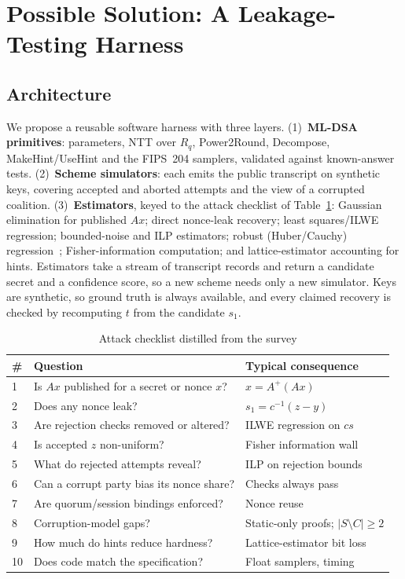 \documentclass[10pt,conference,a4paper]{IEEEtran}
\begin{document}
\section{Possible Solution: A Leakage-Testing Harness}

\subsection{Architecture}
We propose a reusable software harness with three layers.
(1)~\textbf{ML-DSA primitives}: parameters, NTT over $R_q$, Power2Round, Decompose, MakeHint/UseHint and the FIPS~204
samplers, validated against known-answer tests.
(2)~\textbf{Scheme simulators}: each emits the public transcript on synthetic keys, covering accepted and aborted
attempts and the view of a corrupted coalition.
(3)~\textbf{Estimators}, keyed to the attack checklist of Table~\ref{tab:checklist}: Gaussian elimination for published
$Ax$; direct nonce-leak recovery; least squares/ILWE regression; bounded-noise and ILP estimators; robust (Huber/Cauchy)
regression~\cite{concealed}; Fisher-information computation; and lattice-estimator accounting for hints. Estimators take
a stream of transcript records and return a candidate secret and a confidence score, so a new scheme needs only a new
simulator. Keys are synthetic, so ground truth is always available, and every claimed recovery is checked by
recomputing $t$ from the candidate $s_1$.

\begin{table}[t]
\caption{Attack checklist distilled from the survey}\label{tab:checklist}
\centering\footnotesize
\begin{tabularx}{\columnwidth}{@{}lXX@{}}
\toprule
\# & Question & Typical consequence\\
\midrule
1 & Is $Ax$ published for a secret or nonce $x$? & $x=A^{+}(Ax)$\\
2 & Does any nonce leak? & $s_1=c^{-1}(z-y)$\\
3 & Are rejection checks removed or altered? & ILWE regression on $cs$\\
4 & Is accepted $z$ non-uniform? & Fisher information wall\\
5 & What do rejected attempts reveal? & ILP on rejection bounds~\cite{rejected}\\
6 & Can a corrupt party bias its nonce share? & Checks always pass\\
7 & Are quorum/session bindings enforced? & Nonce reuse\\
8 & Corruption-model gaps? & Static-only proofs; $|S\setminus C|\ge2$\\
9 & How much do hints reduce hardness? & Lattice-estimator bit loss\\
10 & Does code match the specification? & Float samplers, timing\\
\bottomrule
\end{tabularx}
\end{table}
\end{document}
